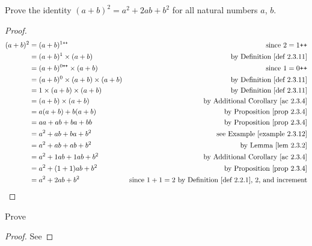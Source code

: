 \begin{exercise}\label{exercise 2.3.4}
Prove the identity \((a + b)^2 = a^2 + 2ab + b^2\) for all natural numbers \(a\), \(b\).
\end{exercise}
\begin{proof}
\begin{align*}
    (a + b)^2 & = (a + b)^{1\INC} & \text{since \(2 = 1\INC\)} \\
              & = (a + b)^1 \X (a + b) & \text{by \DEF{2.3.11}} \\
              & = (a + b)^{0\INC} \X (a + b) & \text{since \(1 = 0\INC\)} \\
              & = (a + b)^0 \X (a + b) \X (a + b) & \text{by \DEF{2.3.11}} \\
              & = 1 \X (a + b) \X (a + b) & \text{by \DEF{2.3.11}} \\
              & = (a + b) \X (a + b) & \text{by \AC{2.3.4}} \\
              & = a(a + b) + b(a + b) & \text{by \PROP{2.3.4}} \\
              & = aa + ab + ba + bb & \text{by \PROP{2.3.4}} \\
              & = a^2 + ab + ba + b^2 & \text{see \EXAMPLE{2.3.12}} \\
              & = a^2 + ab + ab + b^2 & \text{by \LEM{2.3.2}} \\
              & = a^2 + 1ab + 1ab + b^2 & \text{by \AC{2.3.4}} \\
              & = a^2 + (1 + 1)ab + b^2 & \text{by \PROP{2.3.4}} \\
              & = a^2 + 2ab + b^2 & \text{since \(1 + 1 = 2\) by \DEF{2.2.1}, \(2\), and increment}
\end{align*}
\end{proof}

\begin{exercise}\label{exercise 2.3.5}
    Prove 
\end{exercise}
\begin{proof}
    See 
\end{proof}